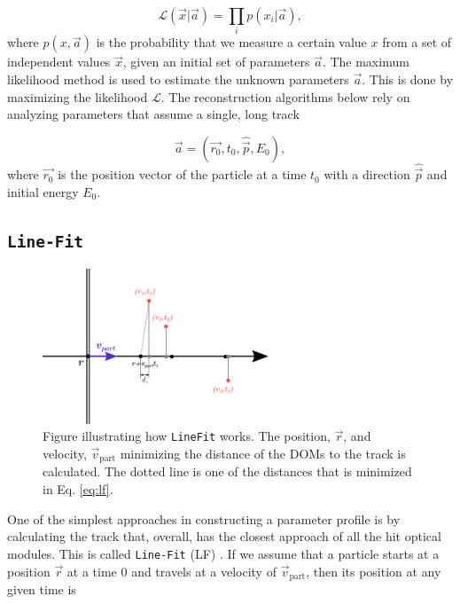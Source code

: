 \begin{equation}
\mathcal{L}(\vec{x}|\vec{a}) = \prod_i p(x_i|\vec{a}),
\end{equation}
\noindent where $p(x,\vec{a})$ is the probability that we measure a certain value $x$ from a set of independent values $\vec{x}$, given an initial set of parameters $\vec{a}$. The maximum likelihood method is used to estimate the unknown parameters $\vec{a}$. This is done by maximizing the likelihood $\mathcal{L}$. The reconstruction algorithms below rely on analyzing parameters that assume a single, long track

\begin{equation}
\label{eq:vec}
\vec{a} = (\vec{r_0},t_0,\hat{\vec{p}},E_0),
\end{equation}
\noindent where $\vec{r_0}$ is the position vector of the particle at a time $t_0$ with a direction $\hat{\vec{p}}$ and initial energy $E_0$. 

\subsection{\texttt{Line-Fit}}
\label{subsec:lf}

\begin{figure}
\centering
\includegraphics[width=0.6\textwidth]{chapter7/img/linefit2.png}
\caption{Figure illustrating how \texttt{LineFit} works. The position, $\vec{r}$, and velocity, $\vec{v}_\textrm{part}$ minimizing the distance of the DOMs to the track is calculated. The dotted line is one of the distances that is minimized in Eq. \ref{eq:lf}.}
\label{fig:lf}
\end{figure}

\noindent One of the simplest approaches in constructing a parameter profile is by calculating the track that, overall, has the closest approach of all the hit optical modules. This is called \texttt{Line-Fit} (LF) \cite{Ahrens:2003fg}. If we assume that a particle starts at a position $\vec{r}$ at a time 0 and travels at a velocity of $\vec{v}_\textrm{part}$, then its position at any given time is

